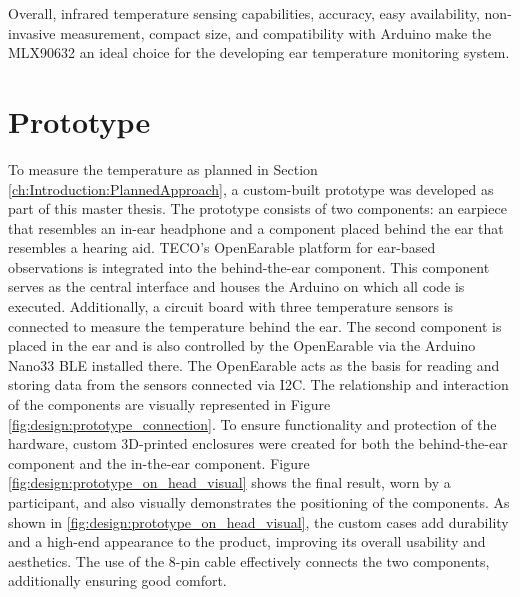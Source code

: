 Overall, infrared temperature sensing capabilities, accuracy, easy availability, non-invasive measurement, compact size, and compatibility with Arduino make the MLX90632 an ideal choice for the developing ear temperature monitoring system.


\section{Prototype}
\label{ch:Design:Prototype}
To measure the temperature as planned in Section \ref{ch:Introduction:PlannedApproach}, a custom-built prototype was developed as part of this master thesis.
The prototype consists of two components: an earpiece that resembles an in-ear headphone and a component placed behind the ear that resembles a hearing aid. TECO's OpenEarable platform for ear-based observations is integrated into the behind-the-ear component. This component serves as the central interface and houses the Arduino on which all code is executed. Additionally, a circuit board with three temperature sensors is connected to measure the temperature behind the ear.
The second component is placed in the ear and is also controlled by the OpenEarable via the Arduino Nano33 BLE installed there. The OpenEarable acts as the basis for reading and storing data from the sensors connected via I2C. The relationship and interaction of the components are visually represented in Figure \ref{fig:design:prototype_connection}.
To ensure functionality and protection of the hardware, custom 3D-printed enclosures were created for both the behind-the-ear component and the in-the-ear component. 
Figure \ref{fig:design:prototype_on_head_visual} shows the final result, worn by a participant, and also visually demonstrates the positioning of the components.
As shown in \ref{fig:design:prototype_on_head_visual}, the custom cases add durability and a high-end appearance to the product, improving its overall usability and aesthetics.
The use of the 8-pin cable effectively connects the two components, additionally ensuring good comfort.

